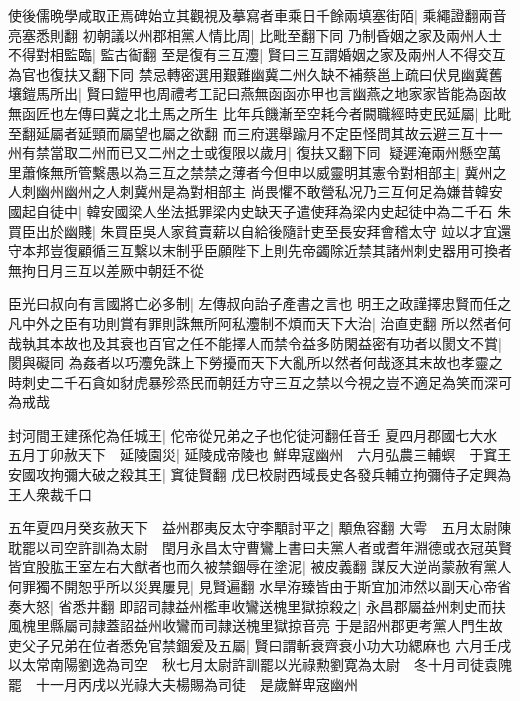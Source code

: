 使後儒晩學咸取正焉碑始立其觀視及摹寫者車乘日千餘兩填塞街陌|{
	乘繩證翻兩音亮塞悉則翻}
初朝議以州郡相黨人情比周|{
	比毗至翻下同}
乃制昏姻之家及兩州人士不得對相監臨|{
	監古䘖翻}
至是復有三互灋|{
	賢曰三互謂婚姻之家及兩州人不得交互為官也復扶又翻下同}
禁忌轉密選用艱難幽冀二州久缺不補蔡邕上疏曰伏見幽冀舊壤鎧馬所出|{
	賢曰鎧甲也周禮考工記曰燕無函函亦甲也言幽燕之地家家皆能為函故無函匠也左傳曰冀之北土馬之所生}
比年兵饑漸至空耗今者闕職經時吏民延屬|{
	比毗至翻延屬者延頸而屬望也屬之欲翻}
而三府選舉踰月不定臣怪問其故云避三互十一州有禁當取二州而已又二州之士或復限以歲月|{
	復扶又翻下同}
疑遲淹兩州懸空萬里蕭條無所管繫愚以為三互之禁禁之薄者今但申以威靈明其憲令對相部主|{
	冀州之人刺幽州幽州之人刺冀州是為對相部主}
尚畏懼不敢營私况乃三互何足為嫌昔韓安國起自徒中|{
	韓安國梁人坐法抵罪梁内史缺天子遣使拜為梁内史起徒中為二千石}
朱買臣出於幽賤|{
	朱買臣吳人家貧賣薪以自給後隨計吏至長安拜會稽太守}
竝以才宜還守本邦豈復顧循三互繫以末制乎臣願陛下上則先帝蠲除近禁其諸州刺史器用可換者無拘日月三互以差厥中朝廷不從

臣光曰叔向有言國將亡必多制|{
	左傳叔向詒子產書之言也}
明王之政謹擇忠賢而任之凡中外之臣有功則賞有罪則誅無所阿私灋制不煩而天下大治|{
	治直吏翻}
所以然者何哉執其本故也及其衰也百官之任不能擇人而禁令益多防閑益密有功者以閡文不賞|{
	閡與礙同}
為姦者以巧灋免誅上下勞擾而天下大亂所以然者何哉逐其末故也孝靈之時刺史二千石貪如豺虎暴殄烝民而朝廷方守三互之禁以今視之豈不適足為笑而深可為戒哉

封河間王建孫佗為任城王|{
	佗帝從兄弟之子也佗徒河翻任音壬}
夏四月郡國七大水　五月丁卯赦天下　延陵園災|{
	延陵成帝陵也}
鮮卑寇幽州　六月弘農三輔螟　于窴王安國攻拘彌大破之殺其王|{
	窴徒賢翻}
戊巳校尉西域長史各發兵輔立拘彌侍子定興為王人衆裁千口

五年夏四月癸亥赦天下　益州郡夷反太守李顒討平之|{
	顒魚容翻}
大雩　五月太尉陳耽罷以司空許訓為太尉　閏月永昌太守曹鸞上書曰夫黨人者或耆年淵德或衣冠英賢皆宜股肱王室左右大猷者也而久被禁錮辱在塗泥|{
	被皮義翻}
謀反大逆尚蒙赦宥黨人何罪獨不開恕乎所以災異屢見|{
	見賢遍翻}
水旱洊臻皆由于斯宜加沛然以副天心帝省奏大怒|{
	省悉井翻}
即詔司隷益州檻車收鸞送槐里獄掠殺之|{
	永昌郡屬益州刺史而扶風槐里縣屬司隷蓋詔益州收鸞而司隷送槐里獄掠音亮}
于是詔州郡更考黨人門生故吏父子兄弟在位者悉免官禁錮爰及五屬|{
	賢曰謂斬衰齊衰小功大功緦麻也}
六月壬戌以太常南陽劉逸為司空　秋七月太尉許訓罷以光祿勲劉寛為太尉　冬十月司徒袁隗罷　十一月丙戌以光祿大夫楊賜為司徒　是歲鮮卑宼幽州

